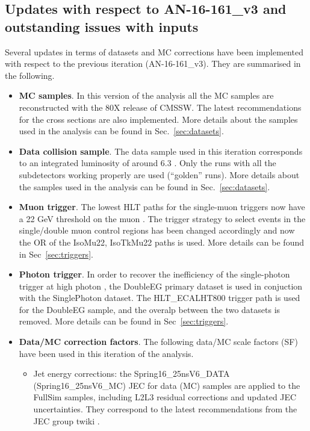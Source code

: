 \subsection{Updates with respect to AN-16-161\_v3 and outstanding issues with inputs\label{sec:disclaimers}}
Several updates in terms of datasets and MC corrections have been implemented with respect to the previous iteration (AN-16-161\_v3). 
They are summarised in the following.\\
\begin{itemize}
\item \textbf{MC samples}. In this version of the analysis all the MC samples are reconstructed with the 80X 
  release of CMSSW. The latest recommendations for the cross sections are also implemented. 
  More details about the samples used in the analysis can be found in Sec.~\ref{sec:datasets}.
\item \textbf{Data collision sample}. The data sample used in this iteration corresponds to an integrated luminosity of around 6.3 \ifb. 
  Only the runs with all the subdetectors working properly are used (``golden'' runs).
  More details about the samples used in the analysis can be found in Sec.~\ref{sec:datasets}. 
\item \textbf{Muon trigger}. The lowest HLT paths for the single-muon triggers now have a 22 GeV threshold on the muon \Pt. 
  The trigger strategy to select events in the single/double muon control regions has been changed accordingly and now the OR of the IsoMu22, IsoTkMu22 paths is used. 
  More details can be found in Sec~\ref{sec:triggers}.
\item \textbf{Photon trigger}. In order to recover the inefficiency of the single-photon trigger at high photon \Pt, 
  the DoubleEG primary dataset is used in conjuction with the SinglePhoton dataset. The HLT\_ECALHT800 trigger path is used for the DoubleEG sample, 
  and the overalp between the two datasets is removed. More details can be found in Sec~\ref{sec:triggers}. 
\item \textbf{Data/MC correction factors}. The following data/MC scale factors (SF) have been used in this iteration of the analysis. 
  \begin{itemize}
  \item Jet energy corrections: the Spring16\_25nsV6\_DATA (Spring16\_25nsV6\_MC) JEC for data (MC) samples are applied to the FullSim samples, 
    including L2L3 residual corrections and updated JEC uncertainties. 
    They correspond to the latest recommendations from the JEC group twiki \cite{twiki-JEC}.

\end{itemize}
\end{itemize}
